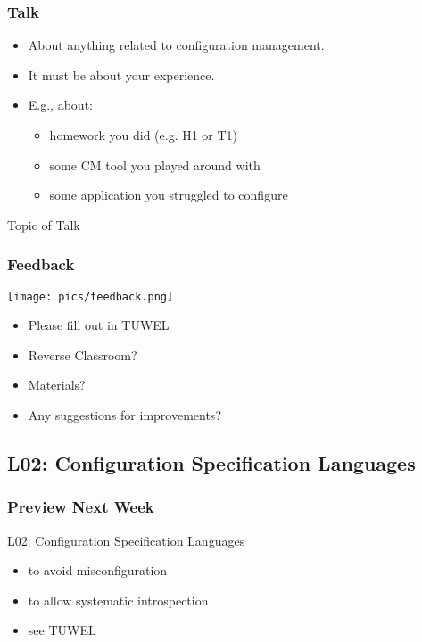 \begin{frame}
	\frametitle{Talk}
	\begin{itemize}
		\item About anything related to configuration management.
		\item It must be about your experience.
		\item E.g., about:
		\begin{itemize}
			\item homework you did (e.g. H1 or T1)
			\item some CM tool you played around with
			\item some application you struggled to configure
		\end{itemize}
	\end{itemize}

	\begin{task}
	Topic of Talk
	\end{task}
\end{frame}

\begin{frame}
	\frametitle{Feedback}
	\hfill \texttt{[image: pics/feedback.png]}
	\vspace{-1cm}
	\begin{itemize}
		\item Please fill out in TUWEL
		\item Reverse Classroom?
		\item Materials?
		\item Any suggestions for improvements?
	\end{itemize}
\end{frame}

\subsection{L02: Configuration Specification Languages}

\begin{frame}
	\frametitle{Preview Next Week}

	L02: Configuration Specification Languages

	\begin{itemize}
	\item to avoid misconfiguration
	\item to allow systematic introspection
	\item see TUWEL
	\end{itemize}
\end{frame}


\nocite{raab2017introducing}

\appendix

\begin{frame}[allowframebreaks]
	
	
\end{frame}




